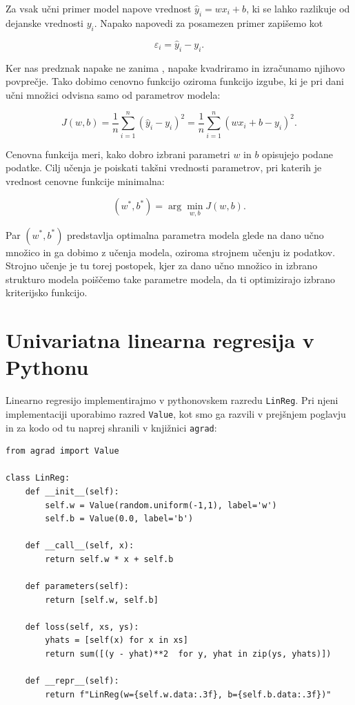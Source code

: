 Za vsak učni primer model napove vrednost $\hat{y}_i = wx_i + b$, ki se lahko razlikuje od dejanske vrednosti $y_i$. Napako napovedi za posamezen primer zapišemo kot

\[
\varepsilon_i = \hat{y}_i - y_i .
\]

Ker nas predznak napake ne zanima , napake kvadriramo in izračunamo njihovo povprečje. Tako dobimo cenovno funkcijo oziroma funkcijo izgube, ki je pri dani učni množici odvisna samo od parametrov modela:

\[
J(w,b) = \frac{1}{n} \sum_{i=1}^{n} (\hat{y}_i - y_i)^2
      = \frac{1}{n} \sum_{i=1}^{n} (wx_i + b - y_i)^2 .
\]

Cenovna funkcija meri, kako dobro izbrani parametri $w$ in $b$ opisujejo podane podatke. Cilj učenja je poiskati takšni vrednosti parametrov, pri katerih je vrednost cenovne funkcije minimalna:

\[
(w^\ast, b^\ast) = 
\arg\min_{w,b} J(w,b).
\]

Par $(w^\ast, b^\ast)$ predstavlja optimalna parametra modela glede na dano učno množico in ga dobimo z učenja modela, oziroma strojnem učenju iz podatkov. Strojno učenje je tu torej postopek, kjer za dano učno množico in izbrano strukturo modela poiščemo take parametre modela, da ti optimizirajo izbrano kriterijsko funkcijo.

\section{Univariatna linearna regresija v Pythonu}

Linearno regresijo implementirajmo v pythonovskem razredu \texttt{LinReg}. Pri njeni implementaciji uporabimo razred \texttt{Value}, kot smo ga razvili v prejšnjem poglavju in za kodo od tu naprej shranili v knjižnici \texttt{agrad}:

\vspace*{3mm}
\begin{lstlisting}
from agrad import Value

class LinReg:
    def __init__(self):
        self.w = Value(random.uniform(-1,1), label='w')
        self.b = Value(0.0, label='b')
    
    def __call__(self, x):
        return self.w * x + self.b
    
    def parameters(self):
        return [self.w, self.b]

    def loss(self, xs, ys):
        yhats = [self(x) for x in xs]
        return sum([(y - yhat)**2  for y, yhat in zip(ys, yhats)])
    
    def __repr__(self):
        return f"LinReg(w={self.w.data:.3f}, b={self.b.data:.3f})"
\end{lstlisting}

